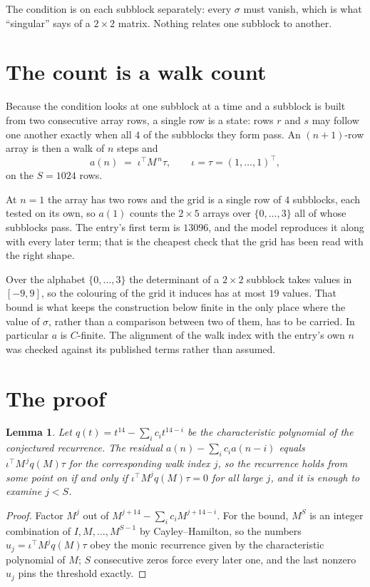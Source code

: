 \documentclass[11pt,a4paper]{article}
\theoremstyle{plain}
\newtheorem{lemma}[theorem]{Lemma}
\theoremstyle{definition}
\begin{document}
The condition is on each subblock separately: every $\sigma$ must vanish, which is what
``singular'' says of a $2\times2$ matrix. Nothing
relates one subblock to another.

\section{The count is a walk count}

Because the condition looks at one subblock at a time and a subblock is
built from two consecutive array rows, a single row is a state: rows $r$ and $s$ may follow one
another exactly when all $4$ of the subblocks they form pass. An $(n+1)$-row array is then a
walk of $n$ steps and
\[
a(n)\;=\;\iota^{\!\top}M^{\,n}\tau,\qquad\iota=\tau=(1,\dots,1)^{\!\top},
\]
on the $S=1024$ rows.

At $n=1$ the array has two rows and the grid is a single row of $4$
subblocks, each tested on its own, so $a(1)$ counts the
$2\times5$ arrays over $\{0,\dots,3\}$ all of whose subblocks pass. The entry's
first term is $13096$, and the model reproduces it along with every later term; that is the
cheapest check that the grid has been read with the right shape.

Over the alphabet $\{0,\dots,3\}$ the determinant of a $2\times2$ subblock takes values in
$[-9,9]$, so the colouring of the grid it induces has at most $19$ values.
That bound is what keeps the construction below finite in the only place where the value of
$\sigma$, rather than a comparison between two of them, has to be carried.
In particular $a$ is $C$-finite. The alignment of the walk index with the entry's own $n$ was
checked against its published terms rather than assumed.

\section{The proof}

\begin{lemma}\label{lem:crit}
Let $q(t)=t^{14}-\sum_i c_it^{14-i}$ be the characteristic polynomial of the
conjectured recurrence. The residual $a(n)-\sum_ic_ia(n-i)$ equals
$\iota^{\!\top}M^{\,j}q(M)\tau$ for the corresponding walk index $j$, so the recurrence
holds from some point on if and only if $\iota^{\!\top}M^{j}q(M)\tau=0$ for all large $j$,
and it is enough to examine $j<S$.
\end{lemma}

\begin{proof}
Factor $M^{j}$ out of $M^{j+14}-\sum_ic_iM^{j+14-i}$. For the bound, $M^{S}$
is an integer combination of $I,M,\dots,M^{S-1}$ by Cayley--Hamilton, so the numbers
$u_j=\iota^{\!\top}M^{j}q(M)\tau$ obey the monic recurrence given by the characteristic
polynomial of $M$; $S$ consecutive zeros force every later one, and the last nonzero $u_j$
pins the threshold exactly.
\end{proof}
\end{document}
